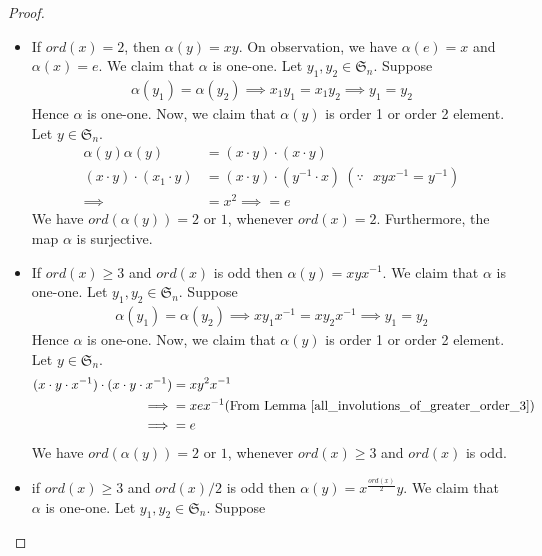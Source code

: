 \documentclass[oneside]{amsart}
\theoremstyle{plain}
\theoremstyle{definition}
\theoremstyle{remark}
\newcommand{\ord}{ord}
\begin{document}
\begin{proof}
\begin{enumerate}
            \begin{itemize}
                \item[Case (i)] If $\ord (x) = 2$, then $\alpha(y) = xy$. On observation, we have $\alpha(e) = x$ and $\alpha(x) = e$. We claim that $\alpha$ is one-one. Let $y_1, y_2 \in \mathfrak{S}_n$. Suppose
                \begin{align*}
                    \alpha(y_1) = \alpha(y_2)
                    \implies x_1y_1  = x_1y_2
                    \implies y_1 = y_2
                \end{align*}
                Hence $\alpha$ is one-one. Now, we claim that $\alpha(y)$ is order 1 or order 2 element. Let $y \in \mathfrak{S}_n$.
                \begin{align*}
                    \alpha(y)\alpha(y) &= (x \cdot y)\cdot(x \cdot y)\\
                    (x \cdot y)\cdot(x_1 \cdot y) &= (x \cdot y)\cdot(y^{-1} \cdot x) \ (\because\text{ $xyx^{-1} = y^{-1}$})\\
                    \implies &= x^2
                    \implies = e
                \end{align*}
                We have $\ord(\alpha(y)) = 2 \text{ or } 1$, whenever $ord(x) = 2$. Furthermore, the map $\alpha$ is surjective.
                \item[Case (ii)] If $\ord(x) \geq 3$ and $\ord(x)$ is odd then $ \alpha(y) = xyx^{-1}$. We claim that $\alpha$ is one-one. Let $y_1, y_2 \in \mathfrak{S}_n$. Suppose
                \begin{align*}
                    \alpha(y_1) = \alpha(y_2)
                    \implies xy_1x^{-1} = xy_2x^{-1}
                    \implies y_1 = y_2
                \end{align*}
                Hence $\alpha$ is one-one. Now, we claim that $\alpha(y)$ is order 1 or order 2 element. Let $y \in \mathfrak{S}_n$.
                \begin{align*}
                    (x \cdot y \cdot x^{-1})\cdot(x \cdot y \cdot x^{-1}) &= xy^2x^{-1}\\
                    \implies &= xex^{-1} (\text{From Lemma \ref{all_involutions_of_greater_order_3}})\\
                    \implies &= e
                \end{align*}
                We have $\ord(\alpha(y)) = 2 \text{ or } 1$, whenever $\ord(x) \geq 3$ and $\ord(x)$ is odd.
                \item[Case (iii)] if $\ord(x) \geq 3$ and $\ord(x)/2$ is odd then $\alpha(y) = x^{\frac{\ord(x)}{2}}y$. We claim that $\alpha$ is one-one. Let $y_1, y_2 \in \mathfrak{S}_n$. Suppose

\end{itemize}
\end{enumerate}
\end{proof}
\end{document}
